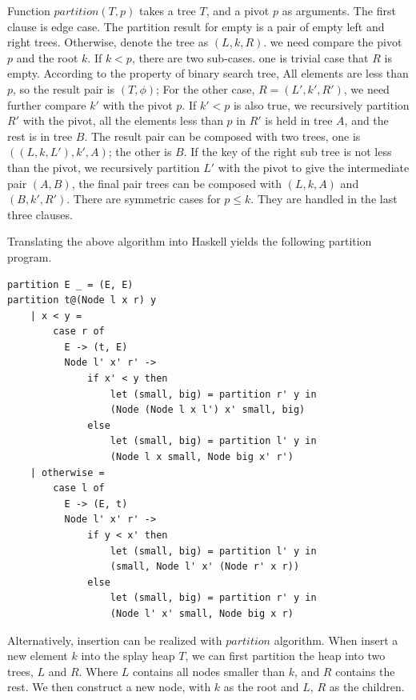 \documentclass[b5paper]{article}
\begin{document}
Function $partition(T, p)$ takes a tree $T$, and a pivot $p$ as arguments.
The first clause is edge case. The partition result for empty is
a pair of empty left and right trees. Otherwise, denote the tree
as $(L, k, R)$. we need compare the pivot $p$ and the root $k$.
If $k < p$, there are two sub-cases. one is trivial case that
$R$ is empty. According to the property of binary search tree,
All elements are less than $p$, so the result pair is $(T, \phi)$;
For the other case, $R = (L', k', R')$, we need further compare
$k'$ with the pivot $p$. If $k' < p$ is also true, we recursively
partition $R'$ with the pivot, all the elements less than $p$ in
$R'$ is held in tree $A$, and the rest is in tree $B$. The
result pair can be composed with two trees, one is $((L, k, L'), k', A)$;
the other is $B$. If the key of the right sub tree is not less than
the pivot, we recursively partition $L'$ with the pivot to give
the intermediate pair $(A, B)$, the final pair trees can be
composed with $(L, k, A)$ and $(B, k', R')$. There are symmetric
cases for $p \leq k$. They are handled in the last three clauses.

Translating the above algorithm into Haskell yields the following partition
program.

\begin{lstlisting}
partition E _ = (E, E)
partition t@(Node l x r) y
    | x < y =
        case r of
          E -> (t, E)
          Node l' x' r' ->
              if x' < y then
                  let (small, big) = partition r' y in
                  (Node (Node l x l') x' small, big)
              else
                  let (small, big) = partition l' y in
                  (Node l x small, Node big x' r')
    | otherwise =
        case l of
          E -> (E, t)
          Node l' x' r' ->
              if y < x' then
                  let (small, big) = partition l' y in
                  (small, Node l' x' (Node r' x r))
              else
                  let (small, big) = partition r' y in
                  (Node l' x' small, Node big x r)
\end{lstlisting}

Alternatively, insertion can be realized with $partition$ algorithm.
When insert a new element $k$ into
the splay heap $T$, we can first partition the heap into two trees, $L$ and $R$. Where
$L$ contains all nodes smaller than $k$, and $R$ contains the rest.
We then construct a new node, with $k$ as the root and $L$, $R$ as the children.
\end{document}
